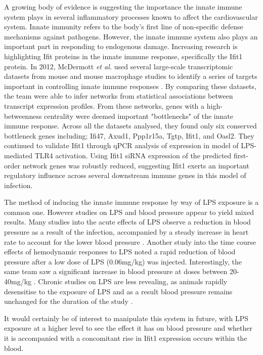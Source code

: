 A growing body of evidence is suggesting the importance the innate immune system plays in several inflammatory processes known to affect the cardiovascular system. Innate immunity refers to the body’s first line of non-specific defense mechanisms against pathogens. However, the innate immune system also plays an important part in responding to endogenous damage. Increasing research is highlighting Ifit proteins in the innate immune response, specifically the Ifit1 protein. In 2012, McDermott \textit{et al.} used several large-scale transcriptomic datasets from mouse and mouse macrophage studies to identify a series of targets important in controlling innate immune responses \cite{McDermott2012}. By comparing these datasets, the team were able to infer networks from statistical associations between transcript expression profiles. From these networks, genes with a high-betweenness centrality were deemed important "bottlenecks" of the innate immune response. Across all the datasets analysed, they found only six conserved bottleneck genes including; Ifi47, Axud1, Ppp1r15a, Tgtp, Ifit1, and Oasl2. They continued to validate Ifit1 through qPCR analysis of expression in model of LPS-mediated TLR4 activation. Using Ifit1 siRNA expression of the predicted first-order network genes was robustly reduced, suggesting Ifit1 exerts an important regulatory influence across several downstream immune genes in this model of infection. 

The method of inducing the innate immune response by way of LPS exposure is a common one. However studies on LPS and blood pressure appear to yield mixed results. Many studies into the acute effects of LPS observe a reduction in blood pressure as a result of the infection, accompanied by a steady increase in heart rate to account for the lower blood pressure \cite{Fan2019}. Another study into the time course effects of hemodynamic responses to LPS noted a rapid reduction of blood pressure after a low dose of LPS (0.06mg/kg) was injected. Interestingly, the same team saw a significant increase in blood pressure at doses between 20-40mg/kg \cite{Brognara2019}. Chronic studies on LPS are less revealing, as animals rapidly desensitise to the exposure of LPS and as a result blood pressure remains unchanged for the duration of the study \cite{Lew2013}. 

It would certainly be of interest to manipulate this system in future, with LPS exposure at a higher level to see the effect it has on blood pressure and whether it is accompanied with a concomitant rise in Ifit1 expression occurs within the blood.

